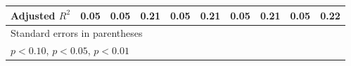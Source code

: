 \begin{table}[htbp]
\begin{tabular}{l*{9}{c}}
Adjusted \(R^{2}\)&     0.05         &     0.05         &     0.21         &     0.05         &     0.21         &     0.05         &     0.21         &     0.05         &     0.22         \\
\hline\hline
\multicolumn{10}{l}{\footnotesize Standard errors in parentheses}\\
\multicolumn{10}{l}{\footnotesize \sym{*} \(p<0.10\), \sym{**} \(p<0.05\), \sym{***} \(p<0.01\)}\\
\end{tabular}
\end{table}
